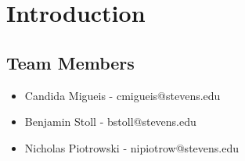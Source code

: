 \setcounter{chapter}{-1}
\chapter{Introduction \\
\label{Introduction}}


\section{Team Members
\label{Section::Team Members}}

\begin{itemize}
\item Candida Migueis - cmigueis@stevens.edu
\item Benjamin Stoll - bstoll@stevens.edu
\item Nicholas Piotrowski - nipiotrow@stevens.edu
\end{itemize}


\newpage


\newpage


\newpage


\newpage


\newpage


\newpage

